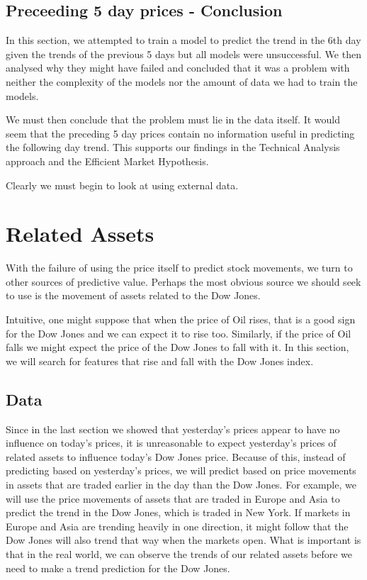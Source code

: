 \documentclass{report}
\begin{document}
\subsection{Preceeding 5 day prices - Conclusion}

In this section, we attempted to train a model to predict the trend in the 6th day given the trends of the previous 5 days but all models were unsuccessful. We then analysed why they might have failed and concluded that it was a problem with neither the complexity of the models nor the amount of data we had to train the models.

We must then conclude that the problem must lie in the data itself. It would seem that the preceding 5 day prices contain no information useful in predicting the following day trend. This supports our findings in the Technical Analysis approach and the Efficient Market Hypothesis.

Clearly we must begin to look at using external data.

\section{Related Assets}

With the failure of using the price itself to predict stock movements, we turn to other sources of predictive value. Perhaps the most obvious source we should seek to use is the movement of assets related to the Dow Jones.

Intuitive, one might suppose that when the price of Oil rises, that is a good sign for the Dow Jones and we can expect it to rise too. Similarly, if the price of Oil falls we might expect the price of the Dow Jones to fall with it. In this section, we will search for features that rise and fall with the Dow Jones index.

\subsection{Data}

Since in the last section we showed that yesterday's prices appear to have no influence on today’s prices, it is unreasonable to expect yesterday's prices of related assets to influence today's Dow Jones price. Because of this, instead of predicting based on yesterday's prices, we will predict based on price movements in assets that are traded earlier in the day than the Dow Jones. For example, we will use the price movements of assets that are traded in Europe and Asia to predict the trend in the Dow Jones, which is traded in New York. If markets in Europe and Asia are trending heavily in one direction, it might follow that the Dow Jones will also trend that way when the markets open. What is important is that in the real world, we can observe the trends of our related assets before we need to make a trend prediction for the Dow Jones.
\end{document}
